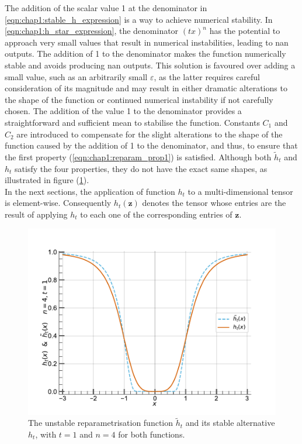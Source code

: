 The addition of the scalar value 1 at the denominator in
\cref{eqn:chap1:stable_h_expression} is a way to achieve numerical stability. In
\cref{eqn:chap1:h_star_expression}, the denominator $(tx)^n$ has the potential
to approach very small values that result in numerical instabilities, leading to
\ac{nan} outputs. The addition of 1 to the denominator makes the function
numerically stable and avoids producing \ac{nan} outputs. This solution is
favoured over adding a small value, such as an arbitrarily small $\varepsilon$,
as the latter requires careful consideration of its magnitude and may result in
either dramatic alterations to the shape of the function or continued numerical
instability if not carefully chosen. The addition of the value 1 to the
denominator provides a straightforward and sufficient mean to stabilise the
function. Constants $C_1$ and $C_2$ are introduced to compensate for the slight
alterations to the shape of the function caused by the addition of 1 to the
denominator, and thus, to ensure that the first property
(\cref{eqn:chap1:reparam_prop1}) is satisfied. Although both $\tilde{h}_t$ and $h_t$
satisfy the four properties, they do not have the exact same shapes, as
illustrated in figure (\ref{fig:chap1:h_stable_vs_unstable}).\\

In the next sections, the application of function $h_t$ to a multi-dimensional
tensor is element-wise. Consequently $h_t(\mathbf{z})$ denotes the tensor whose
entries are the result of applying $h_t$ to each one of the corresponding
entries of $\mathbf{z}$.\\

\begin{figure}
  \centering
  \centerline{\includegraphics[width=0.49\linewidth]{chapter_1/assets/h_stable_vs_unstable.pdf}}
  \caption{ The unstable reparametrisation function $\tilde{h}_t$ and its
    stable alternative $h_t$, with $t=1$ and $n=4$ for both functions.}
  \label{fig:chap1:h_stable_vs_unstable}
\end{figure}


